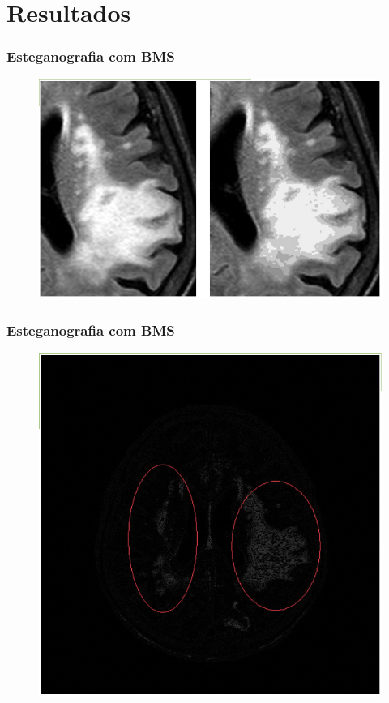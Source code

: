 \documentclass{beamer}
\begin{document}
\section{Resultados}
\begin{frame}
\frametitle{Esteganografia com BMS}
\begin{figure}
\includegraphics[scale=.2]{BMS.png} 

\end{figure}
\end{frame}
\begin{frame}
\frametitle{Esteganografia com BMS}
\begin{figure}
\includegraphics[scale=.2]{BMSdiff.png} 

\end{figure}
\end{frame}
\end{document}
